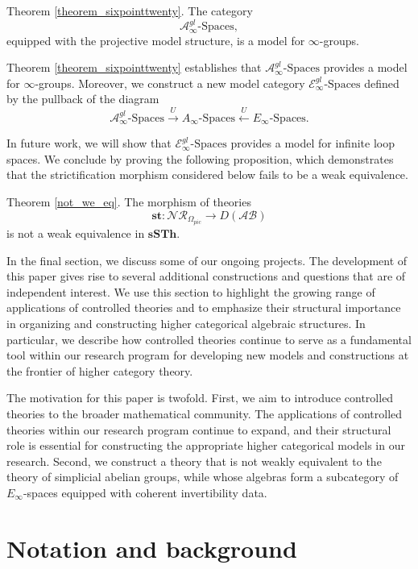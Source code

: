 \documentclass{tac}
\begin{document}
Theorem \ref{theorem_sixpointtwenty}. The category
\[
\mathcal{A}^{gl}_{\infty}\text{-Spaces},
\]
equipped with the projective model structure, is a model for
$\infty$-groups.

Theorem \ref{theorem_sixpointtwenty} establishes that
$\mathcal{A}^{gl}_{\infty}\text{-Spaces}$ provides a model for
$\infty$-groups. Moreover, we construct a new model category $\mathcal{E}^{gl}_{\infty}\text{-Spaces}$
defined by the pullback of the diagram
\[
\mathcal{A}^{gl}_{\infty}\text{-Spaces}
\xrightarrow{U}
A_{\infty}\text{-Spaces}
\xleftarrow{U}
E_{\infty}\text{-Spaces}.
\]

In future work, we will show that
$\mathcal{E}^{gl}_{\infty}\text{-Spaces}$ provides a model for infinite loop
spaces. We conclude by proving the following proposition, which demonstrates
that the strictification morphism considered below fails to be a weak
equivalence.

Theorem \ref{not_we_eq}. The morphism of theories
\[
\mathbf{st}:\mathcal{NR}_{\Omega_{pic}}\longrightarrow D(\mathcal{AB})
\]
is not a weak equivalence in $\mathbf{sSTh}$.

In the final section, we discuss some of our ongoing projects. The
development of this paper gives rise to several additional constructions and
questions that are of independent interest. We use this section to highlight
the growing range of applications of controlled theories and to emphasize their
structural importance in organizing and constructing higher categorical
algebraic structures. In particular, we describe how controlled theories
continue to serve as a fundamental tool within our research program for
developing new models and constructions at the frontier of higher category
theory.

The motivation for this paper is twofold. First, we aim to introduce
controlled theories to the broader mathematical community. The applications of
controlled theories within our research program continue to expand, and their
structural role is essential for constructing the appropriate higher
categorical models in our research. Second, we construct a theory that is not weakly equivalent
to the theory of simplicial abelian groups, while whose algebras form a
subcategory of $E_\infty$-spaces equipped with coherent
invertibility data.
 
\section{Notation and background}
\end{document}
